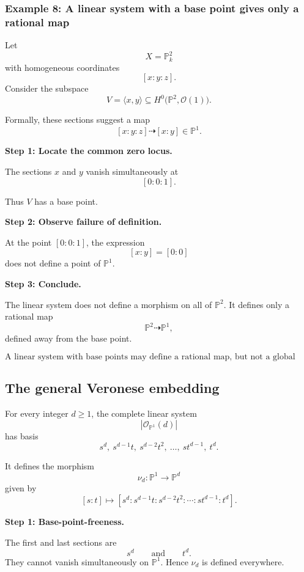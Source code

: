 \documentclass[12pt,a4paper]{article}
\theoremstyle{notespace}
\begin{document}
\subsubsection{Example 8: A linear system with a base point gives only a rational map}

Let
\[
X=\mathbb{P}^{2}_{k}
\]
with homogeneous coordinates
\[
[x:y:z].
\]
Consider the subspace
\[
V=\langle x,y\rangle
\subseteq
H^{0}\bigl(\mathbb{P}^{2},\mathcal{O}(1)\bigr).
\]

Formally, these sections suggest a map
\[
[x:y:z]\dashrightarrow [x:y]\in \mathbb{P}^{1}.
\]

\textbf{Step 1: Locate the common zero locus.}

The sections \(x\) and \(y\) vanish simultaneously at
\[
[0:0:1].
\]

Thus \(V\) has a base point.

\textbf{Step 2: Observe failure of definition.}

At the point \([0:0:1]\), the expression
\[
[x:y]=[0:0]
\]
does not define a point of \(\mathbb{P}^{1}\).

\textbf{Step 3: Conclude.}

The linear system does not define a morphism on all of \(\mathbb{P}^{2}\). It defines only a rational map
\[
\mathbb{P}^{2}\dashrightarrow \mathbb{P}^{1},
\]
defined away from the base point.

\[
\boxed{
	\text{A linear system with base points may define a rational map, but not a global morphism.}
}
\]

\subsection{The general Veronese embedding}

For every integer \(d\geq 1\), the complete linear system
\[
\left|\mathcal{O}_{\mathbb{P}^{1}}(d)\right|
\]
has basis
\[
s^{d},\ s^{d-1}t,\ s^{d-2}t^{2},\ \ldots,\ st^{d-1},\ t^{d}.
\]

It defines the morphism
\[
\nu_{d}:\mathbb{P}^{1}\longrightarrow \mathbb{P}^{d}
\]
given by
\[
[s:t]
\longmapsto
[s^{d}:s^{d-1}t:s^{d-2}t^{2}:\cdots:st^{d-1}:t^{d}].
\]

\textbf{Step 1: Base-point-freeness.}

The first and last sections are
\[
s^{d}
\qquad\text{and}\qquad
t^{d}.
\]
They cannot vanish simultaneously on \(\mathbb{P}^{1}\). Hence \(\nu_{d}\) is defined everywhere.
\end{document}
